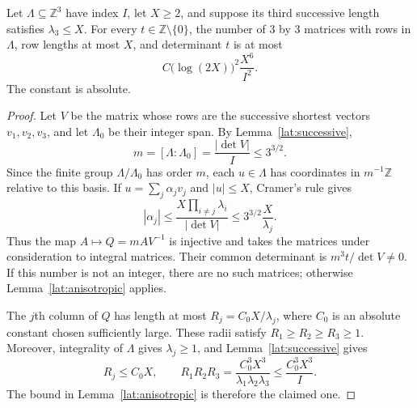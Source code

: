 \begin{proposition}\label{lat:fixed-det}
Let $\Lambda\subseteq\mathbb Z^3$ have index $I$, let $X\ge2$, and
suppose its third successive length satisfies $\lambda_3\le X$.
For every $t\in\mathbb Z\setminus\{0\}$, the number of $3$ by $3$
matrices with rows in $\Lambda$, row lengths at most $X$, and
determinant $t$ is at most
\[
 C\bigl(\log(2X)\bigr)^2\frac{X^6}{I^2}.
\]
The constant is absolute.
\end{proposition}

\begin{proof}
Let $V$ be the matrix whose rows are the successive shortest vectors
$v_1,v_2,v_3$, and let $\Lambda_0$ be their integer span.  By
Lemma~\ref{lat:successive},
\[
 m=[\Lambda:\Lambda_0]=\frac{|\det V|}{I}\le3^{3/2}.
\]
Since the finite group $\Lambda/\Lambda_0$ has order $m$, each
$u\in\Lambda$ has coordinates in $m^{-1}\mathbb Z$ relative to this
basis.  If $u=\sum_j\alpha_jv_j$ and $|u|\le X$, Cramer's rule gives
\[
 |\alpha_j|
 \le\frac{X\prod_{i\ne j}\lambda_i}{|\det V|}
 \le 3^{3/2}\frac{X}{\lambda_j}.
\]
Thus the map $A\mapsto Q=mAV^{-1}$ is injective and takes the matrices
under consideration to integral matrices.  Their common determinant is
$m^3t/\det V\ne0$.  If this number is not an integer, there are no
such matrices; otherwise Lemma~\ref{lat:anisotropic} applies.

The $j$th column of $Q$ has length at most
$R_j=C_0X/\lambda_j$, where $C_0$ is an absolute constant chosen
sufficiently large.  These radii satisfy $R_1\ge R_2\ge R_3\ge1$.
Moreover, integrality of $\Lambda$ gives $\lambda_j\ge1$, and
Lemma~\ref{lat:successive} gives
\[
 R_j\le C_0X,\qquad
 R_1R_2R_3=\frac{C_0^3X^3}{\lambda_1\lambda_2\lambda_3}
 \le\frac{C_0^3X^3}{I}.
\]
The bound in Lemma~\ref{lat:anisotropic} is therefore the claimed one.
\end{proof}
